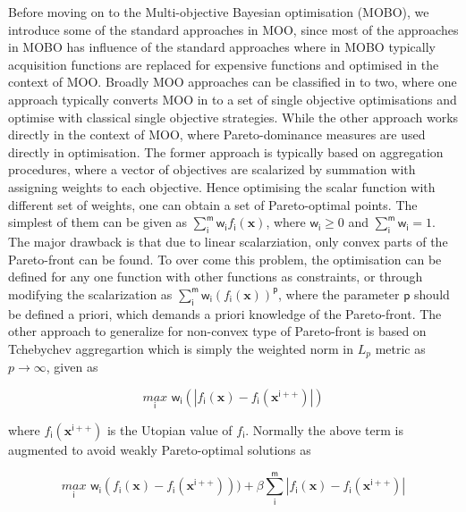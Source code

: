 Before moving on to the Multi-objective Bayesian optimisation (MOBO), we introduce some of the standard approaches in MOO, since most of the approaches in MOBO has influence of the standard approaches where in MOBO typically acquisition functions are replaced for expensive functions and optimised in the context of MOO. Broadly MOO approaches can be classified in to two, where one approach typically converts MOO in to a set of single objective optimisations and optimise with classical single objective strategies. While the other approach works directly in the context of MOO, where Pareto-dominance measures are used directly in optimisation. The former approach is typically based on aggregation procedures, where a vector of objectives are scalarized by summation with assigning weights to each objective. Hence optimising the scalar function with different set of weights, one can obtain a set of Pareto-optimal points. The simplest of them can be given as 
$\sum_{\mathsf{i}}^{\mathsf{m}} \mathsf{w}_{\mathsf{i}} f_{\mathsf{i}}(\bm x)$,
where $\mathsf{w}_{\mathsf{i}}\geq0$ and $\sum_{\mathsf{i}}^{\mathsf{m}} \mathsf{w}_{\mathsf{i}} =1$. 
The major drawback is that due to linear scalarziation, only convex parts of the Pareto-front can be found. To over come this problem, the optimisation can be defined for any one function with other functions as constraints, or through modifying the scalarization as
$\sum_{\mathsf{i}}^{\mathsf{m}} \mathsf{w}_{\mathsf{i}}( f_{\mathsf{i}}(\bm x))^{\mathsf{p}}$,
where the parameter $\mathsf{p}$ should be defined a priori, which demands a priori knowledge of the Pareto-front. The other approach to generalize for non-convex type of Pareto-front is based on Tchebychev aggregartion which is simply the weighted norm in $L_p$ metric as $p \rightarrow \infty$, given as
 
\begin{equation}
\underset{\mathsf{i}}{max} \,\, \mathsf{w}_{\mathsf{i}}( |f_{\mathsf{i}}(\bm x)-f_{\mathsf{i}}(\bm x^{\mathsf{i}++})|)
\end{equation}

where $f_{\mathsf{i}}(\bm x^{\mathsf{i}++})$ is the Utopian value of $f_{\mathsf{i}}$. Normally the above term is augmented to avoid weakly Pareto-optimal solutions as

\begin{equation}
\underset{\mathsf{i}}{max} \,\, \mathsf{w}_{\mathsf{i}}( f_{\mathsf{i}}(\bm x)-f_{\mathsf{i}}(\bm x^{\mathsf{i}++})))+\beta \sum_{\mathsf{i}}^{\mathsf{m}}|f_{\mathsf{i}}(\bm x)-f_{\mathsf{i}}(\bm x^{\mathsf{i}++})|
\end{equation}

